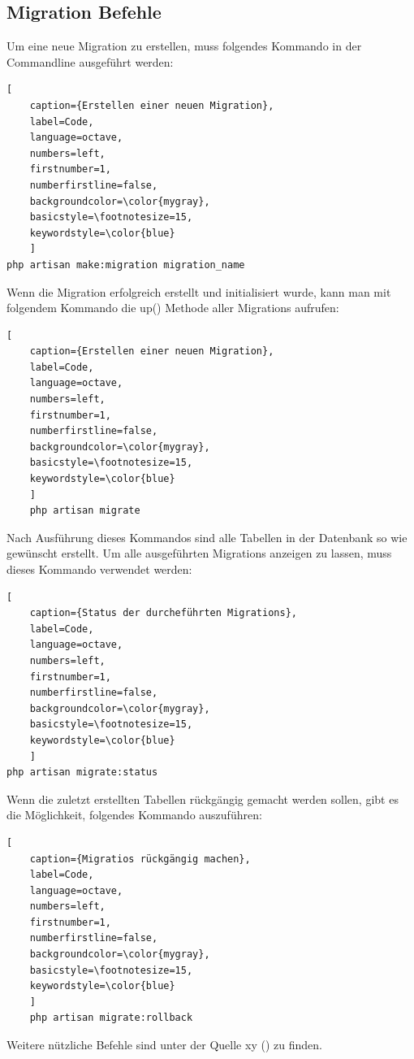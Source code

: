 \subsection{Migration Befehle}
Um eine neue Migration zu erstellen, muss folgendes Kommando in der Commandline ausgeführt werden:
\renewcommand{\lstlistingname}{Quellcode}

\begin{lstlisting}[
	caption={Erstellen einer neuen Migration},
	label=Code,
	language=octave,
	numbers=left,
	firstnumber=1,
	numberfirstline=false,
	backgroundcolor=\color{mygray},
	basicstyle=\footnotesize=15,
	keywordstyle=\color{blue}
	]
php artisan make:migration migration_name
\end{lstlisting}
Wenn die Migration erfolgreich erstellt und initialisiert wurde, kann man mit folgendem Kommando die up() Methode aller Migrations aufrufen:
\renewcommand{\lstlistingname}{Quellcode}

\begin{lstlisting}[
	caption={Erstellen einer neuen Migration},
	label=Code,
	language=octave,
	numbers=left,
	firstnumber=1,
	numberfirstline=false,
	backgroundcolor=\color{mygray},
	basicstyle=\footnotesize=15,
	keywordstyle=\color{blue}
	]
	php artisan migrate
\end{lstlisting}
Nach Ausführung dieses Kommandos sind alle Tabellen in der Datenbank so wie gewünscht erstellt. 
Um alle ausgeführten Migrations anzeigen zu lassen, muss dieses Kommando verwendet werden:
\renewcommand{\lstlistingname}{Quellcode}

\begin{lstlisting}[
	caption={Status der durcheführten Migrations},
	label=Code,
	language=octave,
	numbers=left,
	firstnumber=1,
	numberfirstline=false,
	backgroundcolor=\color{mygray},
	basicstyle=\footnotesize=15,
	keywordstyle=\color{blue}
	]
php artisan migrate:status
\end{lstlisting}
Wenn die zuletzt erstellten Tabellen rückgängig gemacht werden sollen, gibt es die Möglichkeit, folgendes Kommando auszuführen:
\renewcommand{\lstlistingname}{Quellcode}

\begin{lstlisting}[
	caption={Migratios rückgängig machen},
	label=Code,
	language=octave,
	numbers=left,
	firstnumber=1,
	numberfirstline=false,
	backgroundcolor=\color{mygray},
	basicstyle=\footnotesize=15,
	keywordstyle=\color{blue}
	]
	php artisan migrate:rollback 
\end{lstlisting}
Weitere nützliche Befehle sind unter  der Quelle xy () zu finden.

